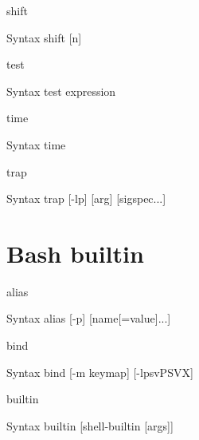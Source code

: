 \documentclass[10pt, compress, aspectratio=169]{beamer}
\begin{document}
\begin{frame}{shift}
  \begin{alertblock}{Syntax}
    shift [n]
  \end{alertblock}
\end{frame}

\begin{frame}{test}
  \begin{alertblock}{Syntax}
    test expression
  \end{alertblock}
\end{frame}

\begin{frame}{time}
  \begin{alertblock}{Syntax}
    time
  \end{alertblock}
\end{frame}

\begin{frame}{trap}
  \begin{alertblock}{Syntax}
    trap [-lp] [arg] [sigspec...]
  \end{alertblock}
  
\end{frame}

\section{Bash builtin}
\begin{frame}{alias}
  \begin{alertblock}{Syntax}
    alias [-p] [name[=value]...]
  \end{alertblock}
\end{frame}

\begin{frame}{bind}
  \begin{alertblock}{Syntax}
    bind [-m keymap] [-lpsvPSVX]
  \end{alertblock}
\end{frame}

\begin{frame}{builtin}
  \begin{alertblock}{Syntax}
    builtin [shell-builtin [args]]
  \end{alertblock}
\end{frame}
\end{document}
